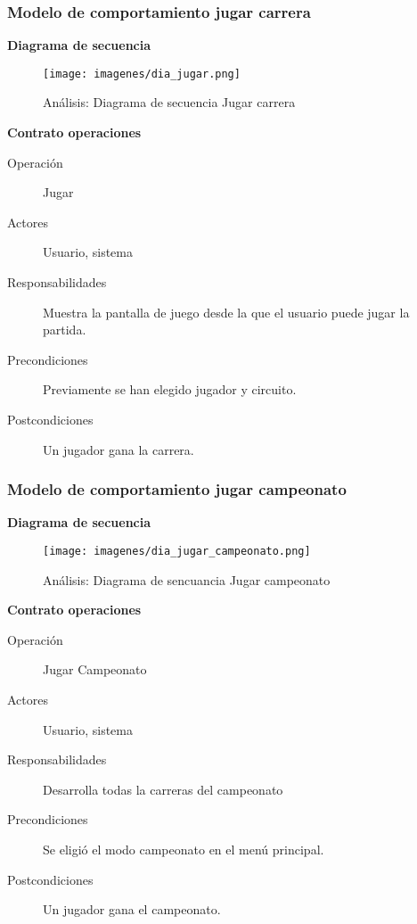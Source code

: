 \subsubsection{Modelo de comportamiento jugar carrera}

\textbf{Diagrama de secuencia}
\begin{figure}[H]
  \label{dia_jugar}
  \begin{center}
    \texttt{[image: imagenes/dia\_jugar.png]}
  \end{center}
  \caption{Análisis: Diagrama de secuencia Jugar carrera}
\end{figure}

\textbf{Contrato operaciones}

\begin{description}
    \item[Operación] Jugar
    \item[Actores] Usuario, sistema
    \item[Responsabilidades] Muestra la pantalla de juego desde la que el usuario puede jugar la partida.
    \item[Precondiciones] Previamente se han elegido jugador y circuito.
    \item[Postcondiciones] Un jugador gana la carrera.
\end{description}

\subsubsection{Modelo de comportamiento jugar campeonato}

\textbf{Diagrama de secuencia}
\begin{figure}[H]
  \label{dia_jugar_campeonato}
  \begin{center}
    \texttt{[image: imagenes/dia\_jugar\_campeonato.png]}
  \end{center}
  \caption{Análisis: Diagrama de sencuancia Jugar campeonato}
\end{figure}

\textbf{Contrato operaciones}

\begin{description}
    \item[Operación] Jugar Campeonato
    \item[Actores] Usuario, sistema
    \item[Responsabilidades] Desarrolla todas la carreras del campeonato
    \item[Precondiciones] Se eligió el modo campeonato en el menú principal.
    \item[Postcondiciones] Un jugador gana el campeonato.
\end{description}

